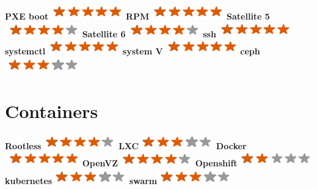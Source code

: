 \documentclass[]{friggeri-cv}
\begin{document}
\begin{aside}
        \textbf{PXE boot}\includegraphics[scale=0.40]{img/5stars.png}
        \textbf{RPM}\includegraphics[scale=0.40]{img/5stars.png}
        \textbf{Satellite 5}\includegraphics[scale=0.40]{img/4stars.png}
        \textbf{Satellite 6}\includegraphics[scale=0.40]{img/4stars.png}
        \textbf{ssh}\includegraphics[scale=0.40]{img/5stars.png}
        \textbf{systemctl}\includegraphics[scale=0.40]{img/5stars.png}
        \textbf{system V}\includegraphics[scale=0.40]{img/5stars.png}
        \textbf{ceph}\includegraphics[scale=0.40]{img/3stars.png}
	~
    \section{Containers}
        \textbf{Rootless}\includegraphics[scale=0.40]{img/4stars.png}
        \textbf{LXC}\includegraphics[scale=0.40]{img/3stars.png}
        \textbf{Docker}\includegraphics[scale=0.40]{img/5stars.png}
        \textbf{OpenVZ}\includegraphics[scale=0.40]{img/4stars.png}
        \textbf{Openshift}\includegraphics[scale=0.40]{img/2stars.png}
        \textbf{kubernetes}\includegraphics[scale=0.40]{img/3stars.png}
        \textbf{swarm}\includegraphics[scale=0.40]{img/3stars.png}
	~

\end{aside}
\end{document}
